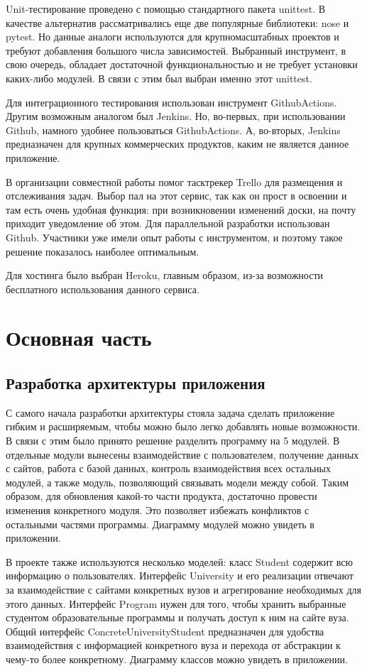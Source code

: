 \documentclass[a4paper,article,14pt]{extarticle}
\begin{document}
Unit-тестирование проведено с помощью стандартного пакета unittest. В качестве альтернатив рассматривались еще две популярные библиотеки: nose и pytest. Но данные аналоги используются для крупномасштабных проектов \cite{unittest} и требуют добавления большого числа зависимостей. Выбранный инструмент, в свою очередь, обладает достаточной функциональностью и не требует установки каких-либо модулей. В связи с этим был выбран именно этот unittest.

Для интеграционного тестирования использован инструмент 
GithubActions. Другим возможным аналогом был Jenkins. Но, во-первых, при использовании Github, намного удобнее пользоваться GithubActions. А, во-вторых, Jenkins предназначен для крупных коммерческих продуктов, каким не является данное приложение.

В организации совместной работы помог тасктрекер Trello для размещения и отслеживания задач. Выбор пал на этот сервис, так как он прост в освоении и там есть очень удобная функция: при возникновении изменений доски, на почту приходит уведомление об этом. Для параллельной разработки использован Github. Участники уже имели опыт работы с инструментом, и поэтому такое решение показалось наиболее оптимальным.

Для хостинга было выбран Heroku, главным образом, из-за возможности бесплатного использования данного сервиса.
\pagebreak

\section{Основная часть}
\subsection{Разработка архитектуры приложения}

С самого начала разработки архитектуры стояла задача сделать приложение гибким и расширяемым, чтобы можно было легко добавлять новые возможности. В связи с этим было принято решение разделить программу на 5 модулей. В отдельные модули вынесены взаимодействие с пользователем, получение данных с сайтов, работа с базой данных, контроль взаимодействия всех остальных модулей, а также модуль, позволяющий связывать модели между собой. Таким образом, для обновления какой-то части продукта, достаточно провести изменения конкретного модуля. Это позволяет избежать конфликтов с остальными частями программы. Диаграмму модулей можно увидеть в приложении. 

В проекте также используются несколько моделей: класс Student содержит всю информацию о пользователях. Интерфейс University и его реализации отвечают за взаимодействие с сайтами конкретных вузов и агрегирование необходимых для этого данных. Интерфейс Program нужен для того, чтобы хранить выбранные студентом образовательные программы и получать доступ к ним на сайте вуза. Общий интерфейс 
ConcreteUniversityStudent предназначен для удобства взаимодействия с информацией конкретного вуза и перехода от абстракции к чему-то более конкретному. Диаграмму классов можно увидеть в приложении.
\end{document}
